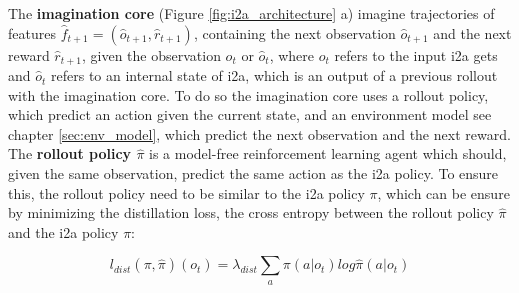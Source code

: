 
The \textbf{imagination core} (Figure \ref{fig:i2a_architecture} a) imagine trajectories of features $\hat{f}_{t+1} = (\hat{o}_{t+1}, \hat{r}_{t+1})$, containing the next observation $\hat{o}_{t+1}$ and the next reward $\hat{r}_{t+1}$, given the observation $o_t$ or $\hat{o}_{t}$, where $o_t$ refers to the input i2a gets and $\hat{o}_{t}$ refers to an internal state of i2a, which is an output of a previous rollout with the imagination core.
To do so the imagination core uses a rollout policy, which predict an action given the current state, and an environment model see chapter \ref{sec:env_model}, which predict the next observation and the next reward.\\




The \textbf{rollout policy $\hat{\pi}$} is a model-free reinforcement learning agent which should, given the same observation, predict the same action as the i2a policy. To ensure this, the rollout policy need to be similar to the i2a policy $\pi$, which can be ensure by minimizing the distillation loss, the cross entropy between the rollout policy $\hat{\pi}$ and the i2a policy $\pi$:

 
\begin{equation} 
    l_{dist}(\pi, \hat{\pi})(o_t) = \lambda_{dist} \sum_a \pi(a | o_t) log \hat{\pi}(a|o_t) 
\end{equation} 

